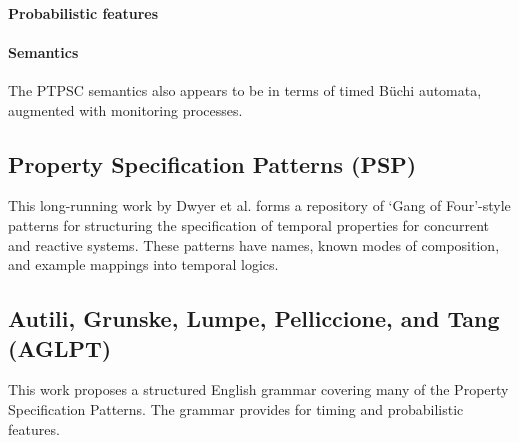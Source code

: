 \paragraph{Probabilistic features}

\paragraph{Semantics}
The PTPSC semantics also appears to be in terms of timed B\"uchi automata,
augmented with monitoring processes.  

\subsection{Property Specification Patterns (PSP)}

This long-running work by Dwyer et al. forms a repository of
`Gang of Four'-style patterns for structuring the specification of temporal
properties for concurrent and reactive systems.  These patterns have names,
known modes of composition, and example mappings into temporal logics.

\subsection{Autili, Grunske, Lumpe, Pelliccione, and Tang (AGLPT)}

This work proposes a structured English grammar covering many of the Property
Specification Patterns.  The grammar provides for timing and probabilistic
features.

